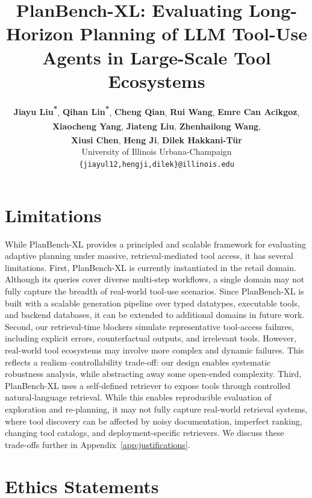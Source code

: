\documentclass[11pt]{article}
\title{\textbf{PlanBench-XL}: Evaluating Long-Horizon Planning of LLM Tool-Use Agents in Large-Scale Tool Ecosystems}
\author{
\textbf{Jiayu Liu\textsuperscript{*}},
\textbf{Qihan Lin\textsuperscript{*}},
\textbf{Cheng Qian\textsuperscript{}},
\textbf{Rui Wang\textsuperscript{}}, 
\textbf{Emre Can Acikgoz\textsuperscript{}}, \\
\textbf{Xiaocheng Yang\textsuperscript{}}, 
\textbf{Jiateng Liu\textsuperscript{}},
\textbf{Zhenhailong Wang}\textsuperscript{},  \\
\textbf{Xiusi Chen\textsuperscript{}},
\textbf{Heng Ji\textsuperscript{}},
\textbf{Dilek Hakkani-T\"ur\textsuperscript{}} \\
University of Illinois Urbana-Champaign \\
 \texttt{\{jiayul12,hengji,dilek\}@illinois.edu}
\\[1.5ex]
\linkblock
}
\newcommand{\bench}[1]{PlanBench-XL}
\begin{document}
\maketitle




















\section*{Limitations}



While \bench{} provides a principled and scalable framework for evaluating adaptive planning under massive, retrieval-mediated tool access, it has several limitations.
First, \bench{} is currently instantiated in the retail domain. Although its queries cover diverse multi-step workflows, a single domain may not fully capture the breadth of real-world tool-use scenarios. Since \bench{} is built with a scalable generation pipeline over typed datatypes, executable tools, and backend databases, it can be extended to additional domains in future work.
Second, our retrieval-time blockers simulate representative tool-access failures, including explicit errors, counterfactual outputs, and irrelevant tools. However, real-world tool ecosystems may involve more complex and dynamic failures. This reflects a realism--controllability trade-off: our design enables systematic robustness analysis, while abstracting away some open-ended complexity.
Third, \bench{} uses a self-defined retriever to expose tools through controlled natural-language retrieval. While this enables reproducible evaluation of exploration and re-planning, it may not fully capture real-world retrieval systems, where tool discovery can be affected by noisy documentation, imperfect ranking, changing tool catalogs, and deployment-specific retrievers.
We discuss these trade-offs further in Appendix~\ref{app:justifications}.

\section*{Ethics Statements}
\end{document}
